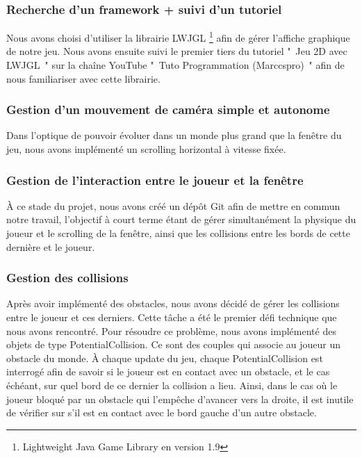 
\subsubsection{Recherche d'un framework + suivi d'un tutoriel}
Nous avons choisi d'utiliser la librairie LWJGL \footnote{Lightweight Java Game Library en version 1.9} afin de gérer l'affiche graphique de notre jeu. Nous avons ensuite suivi le premier tiers du tutoriel " Jeu 2D avec LWJGL " sur la chaîne YouTube " Tuto Programmation (Marccspro) " afin de nous familiariser avec cette librairie.

\subsubsection{Gestion d'un mouvement de caméra simple et autonome}
Dans l'optique de pouvoir évoluer dans un monde plus grand que la fenêtre du jeu, nous avons implémenté un scrolling horizontal à vitesse fixée.

\subsubsection{Gestion de l'interaction entre le joueur et la fenêtre}
À ce stade du projet, nous avons créé un dépôt Git afin de mettre en commun notre travail, l'objectif à court terme étant de gérer simultanément la physique du joueur et le scrolling de la fenêtre, ainsi que les collisions entre les bords de cette dernière et le joueur.

\subsubsection{Gestion des collisions}
Après avoir implémenté des obstacles, nous avons décidé de gérer les collisions entre le joueur et ces derniers. Cette tâche a été le premier défi technique que nous avons rencontré.
\ml
Pour résoudre ce problème, nous avons implémenté des objets de type PotentialCollision.
Ce sont des couples qui associe au joueur un obstacle du monde. À chaque update du jeu, chaque PotentialCollision est interrogé afin de savoir si le joueur est en contact avec un obstacle, et le cas échéant, sur quel bord de ce dernier la collision a lieu.
\ml
Ainsi, dans le cas où le joueur bloqué par un obstacle qui l'empêche d'avancer vers la  droite, il est inutile de vérifier sur s'il est en contact avec le bord gauche d'un autre obstacle.


